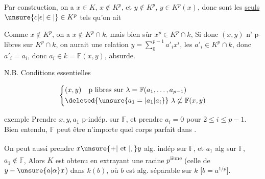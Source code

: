 

Par construction, on a $x\in K$, $x\notin K^p$,  et $y\notin K^p$, $y\in K^p(x)$, donc \deleted{$\alpha,\beta$}  sont les \uline{seuls} $\unsure{c|\epsilon|\in|\vphantom{c}}\in K^p$ tels qu'on ait  

Comme $x\notin K^p$, on a $x\notin K^p\cap k$, mais bien sûr $x^p\in K^p\cap k$, Si donc $(x,y)$ n'  p-libres sur $K^p\cap k$, on aurait une relation $y=\sum_0^{p-1}a'_i x^i$, les $a'_i\in K^p\cap k$, donc   $a'_i=a_i$, donc $a_i\in k=\mathbb F(x,y)$, absurde.

N.B. Conditions essentielles

\[ \left\{\begin{aligned} &(x,y)\quad\text{p libres sur }\lambda=\mathbb F(a_1,\ldots,a_{p-1})\\ &\deleted{\unsure{a_1=|a_1|a_i}}\ \lambda\not\subset\mathbb F(x,y)\end{aligned}\right. \]

 exemple  Prendre $x,y,a_1$  p-indép. sur $\mathbb F$,  et prendre $a_i=0$ pour $2\leq i\leq p-1$. Bien entendu, $\mathbb F$ peut être n'importe quel corps parfait dans .

On peut aussi prendre $x\unsure{+|\ \text{et}\ |,}y$ alg. indép sur $\mathbb F$, et $a_1$ alg\textsuperscript{}  sur $\mathbb F$, $a_1\notin\mathbb F$, Alors $K$ est obtenu  en extrayant une racine $p$\textsuperscript{ième} (celle de $y-\unsure{a|\alpha}x$) dans $k(b)$, où $b$ est alg. séparable sur $k$ [$b=a^{1/p}$].
